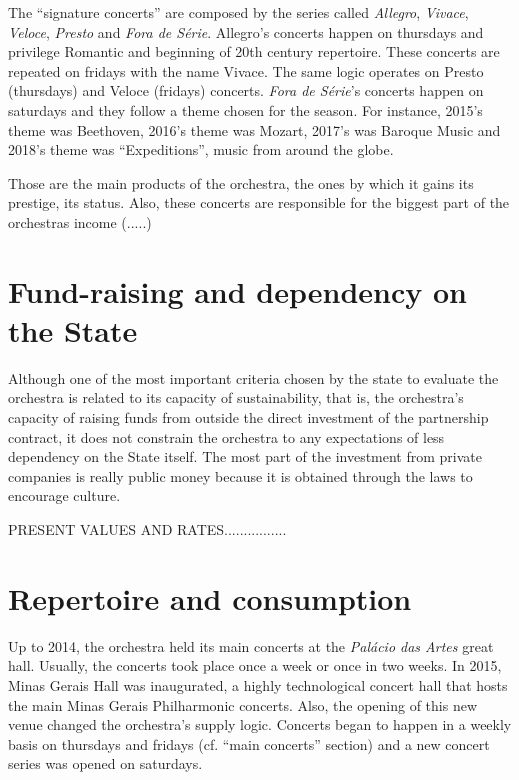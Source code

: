 \documentclass[a4paper, 12pt, openright, oneside, german, french, brazil, english]{abntex2}
\begin{document}
        The ``signature concerts'' are composed by the series called \textit{Allegro}, \textit{Vivace}, \textit{Veloce}, \textit{Presto} and \textit{Fora de Série}. Allegro's concerts happen on thursdays and privilege Romantic and beginning of 20th century repertoire. These concerts are repeated on fridays with the name Vivace. The same logic operates on Presto (thursdays) and Veloce (fridays) concerts. \textit{Fora de Série}'s concerts happen on saturdays and they follow a theme chosen for the season. For instance, 2015's theme was Beethoven, 2016's theme was Mozart, 2017's was Baroque Music and 2018's theme was ``Expeditions'', music from around the globe.

        Those are the main products of the orchestra, the ones by which it gains its prestige, its status. Also, these concerts are responsible for the biggest part of the orchestras income (.....) %

        

        \section{Fund-raising and dependency on the State}

        Although one of the most important criteria chosen by the state to evaluate the orchestra is related to its capacity of sustainability, that is, the orchestra's capacity of raising funds from outside the direct investment of the partnership contract, it does not constrain the orchestra to any expectations of less dependency on the State itself. The most part of the investment from private companies is really public money because it is obtained through the laws to encourage culture.

        PRESENT VALUES AND RATES................


        \section{Repertoire and consumption}

        Up to 2014, the orchestra held its main concerts at the \textit{Palácio das Artes} great hall. Usually, the concerts took place once a week or once in two weeks. In 2015, Minas Gerais Hall was inaugurated, a highly technological concert hall that hosts the main Minas Gerais Philharmonic concerts. Also, the opening of this new venue changed the orchestra's supply logic. Concerts began to happen in a weekly basis on thursdays and fridays (cf. ``main concerts'' section) and a new concert series was opened on saturdays.
\end{document}
